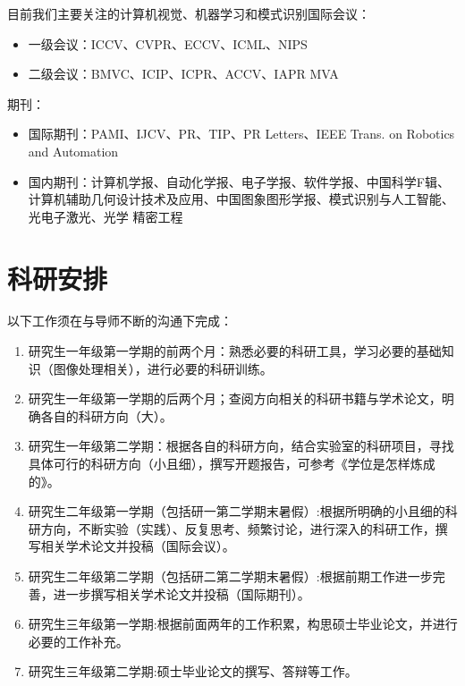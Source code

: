 \documentclass[a4paper，12pt]{article}
\begin{document}
目前我们主要关注的计算机视觉、机器学习和模式识别国际会议：

\begin{itemize}

\item 一级会议：ICCV、CVPR、ECCV、ICML、NIPS

\item 二级会议：BMVC、ICIP、ICPR、ACCV、IAPR MVA

\end{itemize}

期刊：

\begin{itemize}

\item 国际期刊：PAMI、IJCV、PR、TIP、PR Letters、IEEE Trans. on Robotics and Automation

\item 国内期刊：计算机学报、自动化学报、电子学报、软件学报、中国科学F辑、计算机辅助几何设计技术及应用、中国图象图形学报、模式识别与人工智能、光电子激光、光学 精密工程

\end{itemize}

\section{科研安排}

以下工作须在与导师不断的沟通下完成：

\begin{enumerate}

\item 研究生一年级第一学期的前两个月：熟悉必要的科研工具，学习必要的基础知识（图像处理相关），进行必要的科研训练。

\item 研究生一年级第一学期的后两个月；查阅方向相关的科研书籍与学术论文，明确各自的科研方向（大）。

\item 研究生一年级第二学期：根据各自的科研方向，结合实验室的科研项目，寻找具体可行的科研方向（小且细），撰写开题报告，可参考《学位是怎样炼成的》。

\item 研究生二年级第一学期（包括研一第二学期末暑假）:根据所明确的小且细的科研方向，不断实验（实践）、反复思考、频繁讨论，进行深入的科研工作，撰写相关学术论文并投稿（国际会议）。

\item 研究生二年级第二学期（包括研二第二学期末暑假）:根据前期工作进一步完善，进一步撰写相关学术论文并投稿（国际期刊）。

\item 研究生三年级第一学期:根据前面两年的工作积累，构思硕士毕业论文，并进行必要的工作补充。

\item 研究生三年级第二学期:硕士毕业论文的撰写、答辩等工作。

\end{enumerate}
\end{document}
